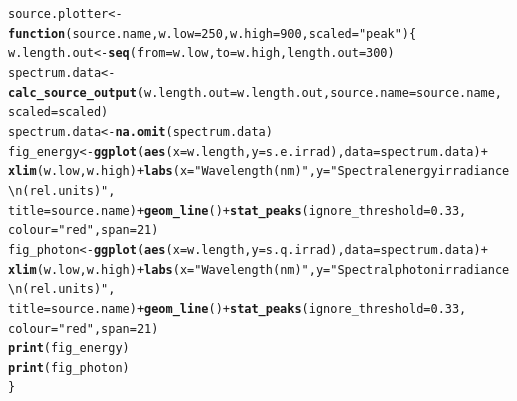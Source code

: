 \documentclass{article}\usepackage[]{graphicx}\usepackage[]{color}
\makeatletter
\newcommand{\hlnum}[1]{\textcolor[rgb]{0.686,0.059,0.569}{#1}}%
\newcommand{\hlstr}[1]{\textcolor[rgb]{0.192,0.494,0.8}{#1}}%
\newcommand{\hlopt}[1]{\textcolor[rgb]{0,0,0}{#1}}%
\newcommand{\hlstd}[1]{\textcolor[rgb]{0.345,0.345,0.345}{#1}}%
\newcommand{\hlkwa}[1]{\textcolor[rgb]{0.161,0.373,0.58}{\textbf{#1}}}%
\newcommand{\hlkwb}[1]{\textcolor[rgb]{0.69,0.353,0.396}{#1}}%
\newcommand{\hlkwc}[1]{\textcolor[rgb]{0.333,0.667,0.333}{#1}}%
\newcommand{\hlkwd}[1]{\textcolor[rgb]{0.737,0.353,0.396}{\textbf{#1}}}%
\newenvironment{kframe}{%
 \def\at@end@of@kframe{}%
 \ifinner\ifhmode%
  \def\at@end@of@kframe{\end{minipage}}%
  \begin{minipage}{\columnwidth}%
 \fi\fi%
 \def\FrameCommand##1{\hskip\@totalleftmargin \hskip-\fboxsep
 \colorbox{shadecolor}{##1}\hskip-\fboxsep
     \hskip-\linewidth \hskip-\@totalleftmargin \hskip\columnwidth}%
 \MakeFramed {\advance\hsize-\width
   \@totalleftmargin\z@ \linewidth\hsize
   \@setminipage}}%
 {\par\unskip\endMakeFramed%
 \at@end@of@kframe}
\newenvironment{knitrout}{}{} %
\makeatother
\begin{document}
\begin{knitrout}\footnotesize
{}\color{fgcolor}\begin{kframe}
\begin{alltt}
\hlstd{source.plotter} \hlkwb{<-} \hlkwa{function}\hlstd{(}\hlkwc{source.name}\hlstd{,} \hlkwc{w.low} \hlstd{=} \hlnum{250}\hlstd{,} \hlkwc{w.high} \hlstd{=} \hlnum{900}\hlstd{,} \hlkwc{scaled} \hlstd{=} \hlstr{"peak"}\hlstd{) \{}
    \hlstd{w.length.out} \hlkwb{<-} \hlkwd{seq}\hlstd{(}\hlkwc{from} \hlstd{= w.low,} \hlkwc{to} \hlstd{= w.high,} \hlkwc{length.out} \hlstd{=} \hlnum{300}\hlstd{)}
    \hlstd{spectrum.data} \hlkwb{<-} \hlkwd{calc_source_output}\hlstd{(}\hlkwc{w.length.out} \hlstd{= w.length.out,} \hlkwc{source.name} \hlstd{= source.name,}
        \hlkwc{scaled} \hlstd{= scaled)}
    \hlstd{spectrum.data} \hlkwb{<-} \hlkwd{na.omit}\hlstd{(spectrum.data)}
    \hlstd{fig_energy} \hlkwb{<-} \hlkwd{ggplot}\hlstd{(}\hlkwd{aes}\hlstd{(}\hlkwc{x} \hlstd{= w.length,} \hlkwc{y} \hlstd{= s.e.irrad),} \hlkwc{data} \hlstd{= spectrum.data)} \hlopt{+}
        \hlkwd{xlim}\hlstd{(w.low, w.high)} \hlopt{+} \hlkwd{labs}\hlstd{(}\hlkwc{x} \hlstd{=} \hlstr{"Wavelength (nm)"}\hlstd{,} \hlkwc{y} \hlstd{=} \hlstr{"Spectral energy irradiance\textbackslash{}n(rel. units)"}\hlstd{,}
        \hlkwc{title} \hlstd{= source.name)} \hlopt{+} \hlkwd{geom_line}\hlstd{()} \hlopt{+} \hlkwd{stat_peaks}\hlstd{(}\hlkwc{ignore_threshold} \hlstd{=} \hlnum{0.33}\hlstd{,}
        \hlkwc{colour} \hlstd{=} \hlstr{"red"}\hlstd{,} \hlkwc{span} \hlstd{=} \hlnum{21}\hlstd{)}
    \hlstd{fig_photon} \hlkwb{<-} \hlkwd{ggplot}\hlstd{(}\hlkwd{aes}\hlstd{(}\hlkwc{x} \hlstd{= w.length,} \hlkwc{y} \hlstd{= s.q.irrad),} \hlkwc{data} \hlstd{= spectrum.data)} \hlopt{+}
        \hlkwd{xlim}\hlstd{(w.low, w.high)} \hlopt{+} \hlkwd{labs}\hlstd{(}\hlkwc{x} \hlstd{=} \hlstr{"Wavelength (nm)"}\hlstd{,} \hlkwc{y} \hlstd{=} \hlstr{"Spectral photon irradiance\textbackslash{}n(rel. units)"}\hlstd{,}
        \hlkwc{title} \hlstd{= source.name)} \hlopt{+} \hlkwd{geom_line}\hlstd{()} \hlopt{+} \hlkwd{stat_peaks}\hlstd{(}\hlkwc{ignore_threshold} \hlstd{=} \hlnum{0.33}\hlstd{,}
        \hlkwc{colour} \hlstd{=} \hlstr{"red"}\hlstd{,} \hlkwc{span} \hlstd{=} \hlnum{21}\hlstd{)}
    \hlkwd{print}\hlstd{(fig_energy)}
    \hlkwd{print}\hlstd{(fig_photon)}
\hlstd{\}}
\end{alltt}
\end{kframe}
\end{knitrout}


\newpage
\end{document}
